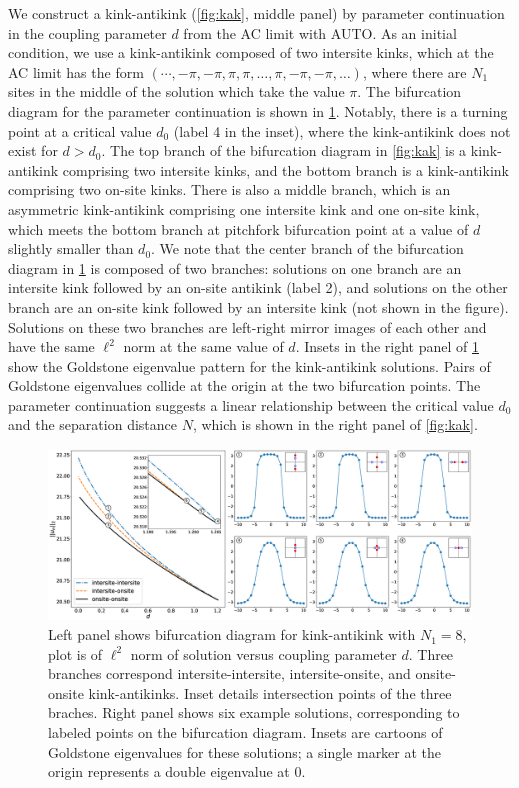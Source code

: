 \documentclass[12pt,reqno]{amsart}
\begin{document}
We construct a kink-antikink (\cref{fig:kak}, middle panel) by parameter continuation in the coupling parameter $d$ from the AC limit with AUTO. As an initial condition, we use a kink-antikink composed of two intersite kinks, which at the AC limit has the form $(\cdots, -\pi, -\pi, \pi, \pi, \dots, \pi, -\pi, -\pi, \dots )$, where there are $N_1$ sites in the middle of the solution which take the value $\pi$. The bifurcation diagram for the parameter continuation is shown in \cref{fig:SGbifdiag}. Notably, there is a turning point at a critical value $d_0$ (label 4 in the inset), where the kink-antikink does not exist for $d > d_0$. The top branch of the bifurcation diagram in \cref{fig:kak} is a kink-antikink comprising two intersite kinks, and the bottom branch is a kink-antikink comprising two on-site kinks. There is also a middle branch, which is an asymmetric kink-antikink comprising one intersite kink and one on-site kink, which meets the bottom branch at pitchfork bifurcation point at a value of $d$ slightly smaller than $d_0$. We note that the center branch of the bifurcation diagram in \cref{fig:SGbifdiag} is composed of two branches: solutions on one branch are an intersite kink followed by an on-site antikink (label 2), and solutions on the other branch are an on-site kink followed by an intersite kink (not shown in the figure). Solutions on these two branches are left-right mirror images of each other and have the same $\ell^2$ norm at the same value of $d$. Insets in the right panel of \cref{fig:SGbifdiag} show the Goldstone eigenvalue pattern for the kink-antikink solutions. Pairs of Goldstone eigenvalues collide at the origin at the two bifurcation points. The parameter continuation suggests a linear relationship between the critical value $d_0$ and the separation distance $N$, which is shown in the right panel of  \cref{fig:kak}.

\begin{figure}[H]
	\begin{center}
	\includegraphics[width=16.5cm]{SGbifdiag.eps}
	\end{center}
	\caption{Left panel shows bifurcation diagram for kink-antikink with $N_1 = 8$, plot is of $\ell^2$ norm of solution versus coupling parameter $d$. Three branches correspond intersite-intersite, intersite-onsite, and onsite-onsite kink-antikinks. Inset details intersection points of the three braches. Right panel shows six example solutions, corresponding to labeled points on the bifurcation diagram. Insets are cartoons of Goldstone eigenvalues for these solutions; a single marker at the origin represents a double eigenvalue at 0.}
	\label{fig:SGbifdiag}
\end{figure}
\end{document}
